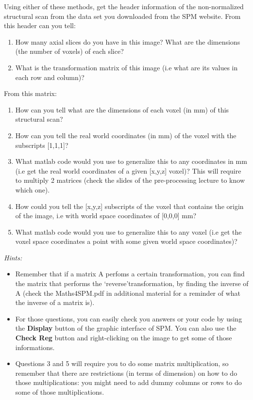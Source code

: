\documentclass[a4paper,10pt]{article}
\begin{document}
Using either of these methods, get the header information of the non-normalized structural scan from the data set you downloaded from the SPM website. From this header can you tell:
\begin{enumerate}
  \item How many axial slices do you have in this image? What are the dimensions (the number of voxels) of each slice?
  \item What is the transformation matrix of this image (i.e what are its values in each row and column)? 
\end{enumerate}

From this matrix:
\begin{enumerate}
  \item How can you tell what are the dimensions of each voxel (in mm) of this structural scan?
  \item How can you tell the real world coordinates (in mm) of the voxel with the subscripts [1,1,1]? 
  \item What matlab code would you use to generalize this to any coordinates in mm (i.e get the real world coordinates of a given [x,y,z] voxel)? This will require to multiply 2 matrices (check the slides of the pre-processing lecture to know which one).
  \item How could you tell the [x,y,z] subscripts of the voxel that contains the origin of the image, i.e with world space coordinates of [0,0,0] mm? 
  \item What matlab code would you use to generalize this to any voxel (i.e get the voxel space coordinates a point with some given world space coordinates)?
\end{enumerate}

\medskip
\textit{Hints:}
\begin{itemize}
 \item Remember that if a matrix A perfoms a certain transformation, you can find the matrix that performs the \textquoteleft reverse\textquoteright  transformation, by finding the inverse of A (check the Maths4SPM.pdf in additional material for a reminder of what the inverse of a matrix is).
 \item For those questions, you can easily check you answers or your code by using the \textbf{Display} button of the graphic interface of SPM. You can also use the \textbf{Check Reg} button and right-clicking on the image to get some of those informations. 
 \item Questions 3 and 5 will require you to do some matrix multiplication, so remember that there are restrictions (in terms of dimension) on how to do those multiplications: you might need to add dummy columns or rows to do some of those multiplications.
\end{itemize}
\end{document}
